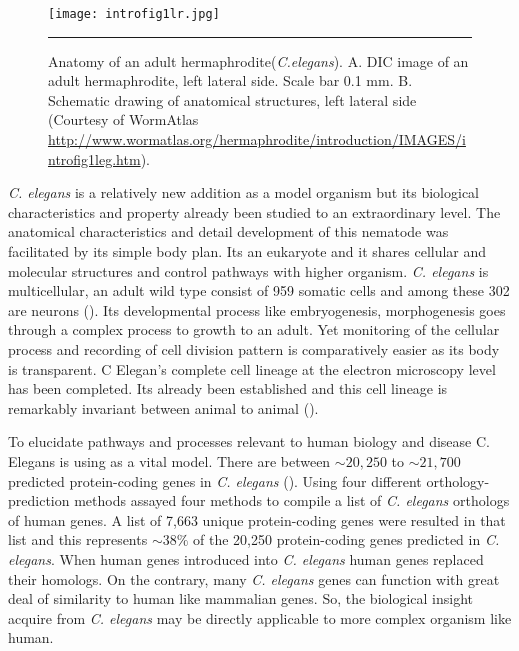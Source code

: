 \begin{figure}%
	\centering
		\texttt{[image: introfig1lr.jpg]}
		\rule{35em}{0.5pt}
	\caption[Anatomy of an adult]{Anatomy of an adult hermaphrodite(\textit{C.elegans}). 
	A. DIC image of an adult hermaphrodite, left lateral side. Scale bar 0.1 mm. 
	B. Schematic drawing of anatomical structures, left lateral side 
	(Courtesy of WormAtlas \url{http://www.wormatlas.org/hermaphrodite/introduction/IMAGES/introfig1leg.htm}).}
	\label{fig:anatomy}
\end{figure}

\textit{C. elegans} is a relatively new addition as a model organism but its biological characteristics 
and property already been studied to an extraordinary level. The anatomical characteristics and 
detail development of this nematode was facilitated by its simple body plan. Its an eukaryote and
it shares cellular and molecular structures and control pathways with higher organism. \textit{C. elegans}
is multicellular, an adult wild type  consist of 959 somatic cells and among these 302 are neurons
(\cite{Sulston:1977, Palikaras:2013}). Its developmental process like embryogenesis, morphogenesis 
goes through a complex process to growth to an adult. Yet monitoring of the cellular process 
and recording of cell division pattern is comparatively easier as its body is transparent. 
C Elegan's complete cell lineage at the electron microscopy level has been completed. 
Its already been established and this cell lineage is remarkably invariant between animal to
animal (\cite{Brenner:1974, Byerly:1976, Sulston:1980, Wood:1988}).


To elucidate pathways and processes relevant to human biology 
and disease C. Elegans is using as a vital model. There are between $\sim20,250$ to $\sim21,700$ 
predicted protein-coding genes in \textit{C. elegans} (\cite{Gerstein:2010}).
Using four different orthology-prediction methods \cite{Daniel:2011} assayed four methods 
to compile a list of \textit{C. elegans} orthologs of human genes. 
A  list of 7,663 unique protein-coding genes were resulted in that list and this
represents $\sim38\%$ of the 20,250 protein-coding genes predicted in \textit{C. elegans}. When human genes 
introduced into \textit{C. elegans} human genes replaced their homologs. On the contrary, many \textit{C. elegans}
genes can function with great deal of similarity to human like mammalian genes. So, 
the biological insight acquire from \textit{C. elegans} may be directly applicable to more 
complex organism like human.


